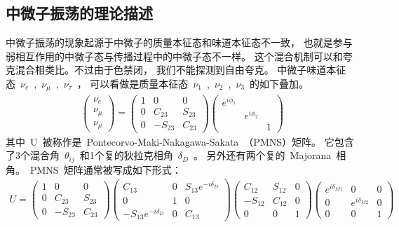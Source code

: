 \subsection{中微子振荡的理论描述}
中微子振荡的现象起源于中微子的质量本征态和味道本征态不一致，
也就是参与弱相互作用的中微子态与传播过程中的中微子态不一样。
这个混合机制可以和夸克混合相类比。不过由于色禁闭，
我们不能探测到自由夸克。
中微子味道本征态~$\nu_e$~,~$\nu_{\mu}$~,~$\nu_{\tau}$~，
可以看做是质量本征态~$\nu_1$~,~$\nu_2$~,~$\nu_3$~的如下叠加。
\begin{eqnarray}
\left(\begin{array}{c}
\nu_e \\ \nu_{\mu} \\  \nu_{\mu}
 \end{array} \right)
 =\left(\begin{array}{ccc}
      1 & 0 & 0 \\ 0 & C_{23} & S_{23} \\ 0 & -S_{23} & C_{23}
      \end{array} \right)
 \left(\begin{array}{ccc}
    e^{i\phi_1}  &  &    \\
    &  e^{i\phi_2}  &    \\
    &               & 1    \end{array} \right)
\label{eq:linearMix1}
\end{eqnarray}
其中~U~被称作是~Pontecorvo-Maki-Nakagawa-Sakata~（PMNS）矩阵。
它包含了3个混合角~$\theta_{ij}$~和1个复的狄拉克相角~$\delta_D$~。
另外还有两个复的~Majorana~相角。~PMNS~矩阵通常被写成如下形式：
\begin{eqnarray} U
 =\left(\begin{array}{ccc}
      1 & 0 & 0 \\ 0 & C_{23} & S_{23} \\ 0 & -S_{23} & C_{23}
      \end{array} \right)
 \left(\begin{array}{ccc}
      C_{13} & 0 & S_{13}e^{-i\delta_D} \\ 0 & 1 & 0 \\
      -S_{13}e^{-i\delta_D} & 0 & C_{13}
      \end{array} \right)
 \left(\begin{array}{ccc}
      C_{12} & S_{12} & 0 \\ -S_{12} & C_{12} & 0 \\ 0 & 0 & 1
      \end{array} \right)
 \left(\begin{array}{ccc}
    e^{i\delta_{M1}}  & 0 &  0  \\
   0 & e^{i\delta_{M2}}  & 0   \\
    0&     0          & 1    \end{array} \right)
\label{eq:MMatrix}
\end{eqnarray}
